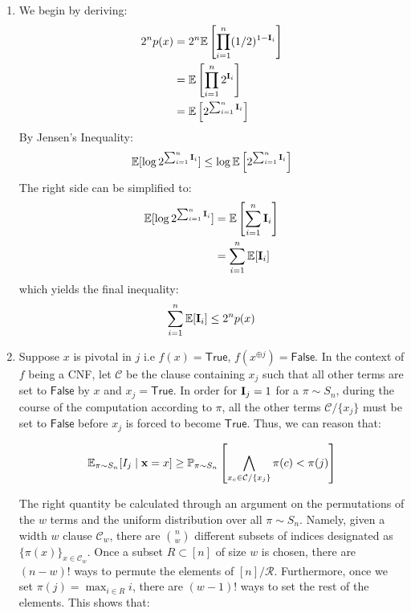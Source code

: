 \documentclass[12pt]{article}%
\newcommand{\Exp}[1]{\mathbb{E}_{#1}}
\begin{document}
\begin{enumerate}
  \item
  We begin by deriving:
  \begin{align*}
    2^np(x) & = 2^n \mathbb{E}\left[ \prod_{i=1}^n (1/2)^{1 - {\bf I}_{i}} \right] \\
            & = \mathbb{E}\left[ \prod_{i=1}^n 2^{{\bf I}_{i}} \right] \\
            & = \mathbb{E}\left[ 2^{\sum_{i = 1}^n {\bf I}_i} \right]
  \end{align*}
  By Jensen's Inequality:
  \begin{align*}
    \mathbb{E}[\log{2^{\sum_{i = 1}^n {\bf I}_i}}] \leq \log{\mathbb{E}\left[ 2^{\sum_{i = 1}^n {\bf I}_i} \right]}
  \end{align*}
  The right side can be simplified to:
  \begin{align*}
    \mathbb{E}[\log{2^{\sum_{i = 1}^n {\bf I}_i}}] & = \mathbb{E}\left[\sum_{i = 1}^n {\bf I}_i \right] \\
    & = \sum_{i = 1}^n \mathbb{E}[{\bf I}_i ]
  \end{align*}
  which yields the final inequality:
  \begin{align*}
    \sum_{i = 1}^n \mathbb{E}[{\bf I}_i ] \leq 2^np(x)
  \end{align*}

  \item
  Suppose $x$ is pivotal in $j$ i.e $f(x) = \mathsf{True}$, $f(x^{\oplus j}) = \mathsf{False}$. In the context of $f$ being a CNF, let $\mathcal{C}$ be the clause containing $x_j$ such that all other terms are set to $\mathsf{False}$ by $x$ and $x_j = \mathsf{True}$. In order for ${\bf I}_j = 1$ for a $\pi \sim S_n$, during the course of the computation according to $\pi$, all the other terms $\mathcal{C} / \{x_j\}$  must be set to $\mathsf{False}$ before $x_j$ is forced to become $\mathsf{True}$. Thus, we can reason that:

  \begin{align*}
    \Exp{\pi \sim S_n}[I_j \mid {\bf x} = x] \geq \mathbb{P}_{\pi \sim S_n}\left[\bigwedge_{x_c \in \mathcal{C} / \{x_j\}} \pi(c) < \pi(j) \right]
  \end{align*}

  The right quantity be calculated through an argument on the permutations of the $w$ terms and the uniform distribution over all $\pi \sim S_n$. Namely, given a width $w$ clause $\mathcal{C}_w$, there are ${n \choose w}$ different subsets of indices designated as $\{\pi(x)\}_{x \in \mathcal{C}_w}$. Once a subset $R \subset [n]$ of size $w$ is chosen, there are $(n-w)!$ ways to permute the elements of $[n]/\mathcal{R}$. Furthermore, once we set $\pi(j) =  \max_{i \in R} i$, there are $(w-1)!$ ways to set the rest of the elements. This shows that:


\end{enumerate}
\end{document}
